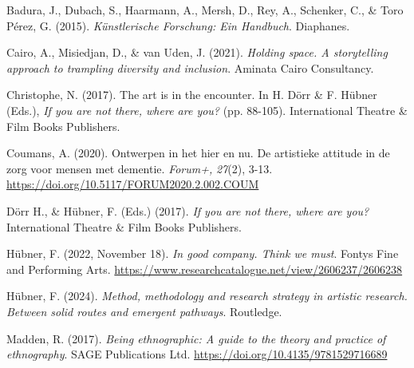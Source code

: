 \documentclass[authordate, empirical]{jote-new-article}
\begin{document}
	{

	Badura, J., Dubach, S., Haarmann, A., Mersh, D., Rey, A., Schenker, C., \& Toro Pérez, G. (2015). \emph{Künstlerische Forschung: Ein Handbuch}. Diaphanes.







	Cairo, A., Misiedjan, D., \& van Uden, J. (2021). \emph{Holding space. A storytelling approach to trampling diversity and inclusion}. Aminata Cairo Consultancy.







	Christophe, N. (2017). The art is in the encounter. In H. Dörr \& F. Hübner (Eds.), \emph{If you are not there, where are you?} (pp. 88-105). International Theatre \& Film Books Publishers.







	Coumans, A. (2020). Ontwerpen in het hier en nu. De artistieke attitude in de zorg voor mensen met dementie. \emph{Forum+,} \emph{27}(2), 3-13. \url{https://doi.org/10.5117/FORUM2020.2.002.COUM}







	Dörr H., \& Hübner, F. (Eds.) (2017). \emph{If you are not there, where are you?} International Theatre \& Film Books Publishers.







	Hübner, F. (2022, November 18). \emph{In good company. Think we must}. Fontys Fine and Performing Arts. \url{https://www.researchcatalogue.net/view/2606237/2606238}







	Hübner, F. (2024). \emph{Method, methodology and research strategy in artistic research. Between solid routes and emergent pathways}. Routledge.







	Madden, R. (2017). \emph{Being ethnographic: A guide to the theory and practice of ethnography}. SAGE Publications Ltd. \url{https://doi.org/10.4135/9781529716689}

	}
\end{document}
